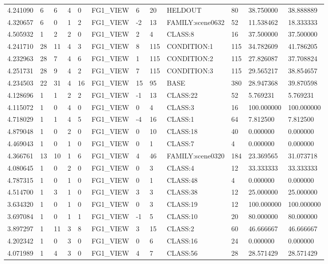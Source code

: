 \begin{tabular}{llllllllllll}
4.241090 & 6 & 6 & 4 & 0 & FG1\_VIEW & 6 & 20 & HELDOUT & 80 & 38.750000 & 38.888889 \\
4.320657 & 6 & 0 & 1 & 2 & FG1\_VIEW & -2 & 13 & FAMILY:scene0632 & 52 & 11.538462 & 18.333333 \\
4.505932 & 1 & 2 & 2 & 0 & FG1\_VIEW & 2 & 4 & CLASS:8 & 16 & 37.500000 & 37.500000 \\
4.241710 & 28 & 11 & 4 & 3 & FG1\_VIEW & 8 & 115 & CONDITION:1 & 115 & 34.782609 & 41.786205 \\
4.232963 & 28 & 7 & 4 & 6 & FG1\_VIEW & 1 & 115 & CONDITION:2 & 115 & 27.826087 & 37.708824 \\
4.251731 & 28 & 9 & 4 & 2 & FG1\_VIEW & 7 & 115 & CONDITION:3 & 115 & 29.565217 & 38.854657 \\
4.234503 & 22 & 31 & 4 & 16 & FG1\_VIEW & 15 & 95 & BASE & 380 & 28.947368 & 39.870598 \\
4.128696 & 1 & 1 & 2 & 2 & FG1\_VIEW & -1 & 13 & CLASS:22 & 52 & 5.769231 & 5.769231 \\
4.115072 & 1 & 0 & 4 & 0 & FG1\_VIEW & 0 & 4 & CLASS:3 & 16 & 100.000000 & 100.000000 \\
4.718029 & 1 & 1 & 4 & 5 & FG1\_VIEW & -4 & 16 & CLASS:1 & 64 & 7.812500 & 7.812500 \\
4.879048 & 1 & 0 & 2 & 0 & FG1\_VIEW & 0 & 10 & CLASS:18 & 40 & 0.000000 & 0.000000 \\
4.469043 & 1 & 0 & 1 & 0 & FG1\_VIEW & 0 & 1 & CLASS:7 & 4 & 0.000000 & 0.000000 \\
4.366761 & 13 & 10 & 1 & 6 & FG1\_VIEW & 4 & 46 & FAMILY:scene0320 & 184 & 23.369565 & 31.073718 \\
4.080645 & 1 & 0 & 2 & 0 & FG1\_VIEW & 0 & 3 & CLASS:4 & 12 & 33.333333 & 33.333333 \\
4.787315 & 1 & 0 & 1 & 0 & FG1\_VIEW & 0 & 1 & CLASS:48 & 4 & 0.000000 & 0.000000 \\
4.514700 & 1 & 3 & 1 & 0 & FG1\_VIEW & 3 & 3 & CLASS:38 & 12 & 25.000000 & 25.000000 \\
3.634320 & 1 & 0 & 1 & 0 & FG1\_VIEW & 0 & 3 & CLASS:19 & 12 & 100.000000 & 100.000000 \\
3.697084 & 1 & 0 & 1 & 1 & FG1\_VIEW & -1 & 5 & CLASS:10 & 20 & 80.000000 & 80.000000 \\
3.897297 & 1 & 11 & 3 & 8 & FG1\_VIEW & 3 & 15 & CLASS:2 & 60 & 46.666667 & 46.666667 \\
4.202342 & 1 & 0 & 3 & 0 & FG1\_VIEW & 0 & 6 & CLASS:16 & 24 & 0.000000 & 0.000000 \\
4.071989 & 1 & 4 & 3 & 0 & FG1\_VIEW & 4 & 7 & CLASS:56 & 28 & 28.571429 & 28.571429 \\

\end{tabular}
